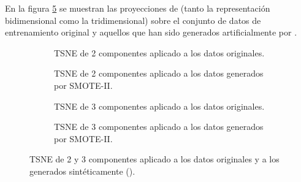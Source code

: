             En la figura \ref{TSNEImages} se muestran las proyecciones de  (tanto la representación bidimensional como la tridimensional) sobre el conjunto de datos de entrenamiento original y aquellos que han sido generados artificialmente por .


            \begin{figure}
                \centering
                \begin{subfigure}[b]{0.4\textwidth}
                    \centering
                    
                    \caption{TSNE de 2 componentes aplicado a los datos originales.}
                    \label{TSNEImages:Clean2D}
                \end{subfigure}
                \begin{subfigure}[b]{0.4\textwidth}
                    \centering
                    
                    \caption{TSNE de 2 componentes aplicado a los datos generados por SMOTE-II.}
                    \label{TSNEImages:Train2D}

                \end{subfigure}
                \begin{subfigure}[b]{0.4\textwidth}
                    \centering
                    
                    \caption{TSNE de 3 componentes aplicado a los datos originales.}
                    \label{TSNEImages:Clean3D}
                \end{subfigure}
                \begin{subfigure}[b]{0.4\textwidth}
                    \centering
                    
                    \caption{TSNE de 3 componentes aplicado a los datos generados por SMOTE-II.}
                    \label{TSNEImages:Train3D}
                \end{subfigure}
                \caption{TSNE de 2 y 3 componentes aplicado a los datos originales y a los generados sintéticamente ().}
                \label{TSNEImages}
             \end{figure}


